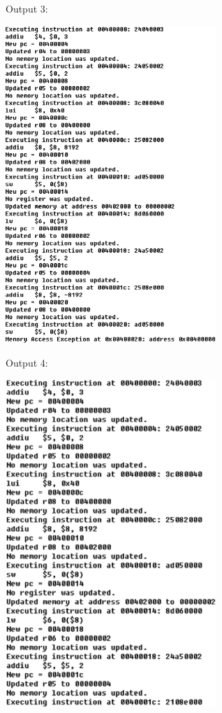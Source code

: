 \documentclass[12pt]{article}
\begin{document}
{\begin{center}
\end{center}
Output 3:
\begin{center}
\includegraphics[width=80mm]{output3.png}
\end{center}
Output 4:
\begin{center}
\includegraphics[width=80mm]{output4.png}
\end{center}
}
\end{document}
